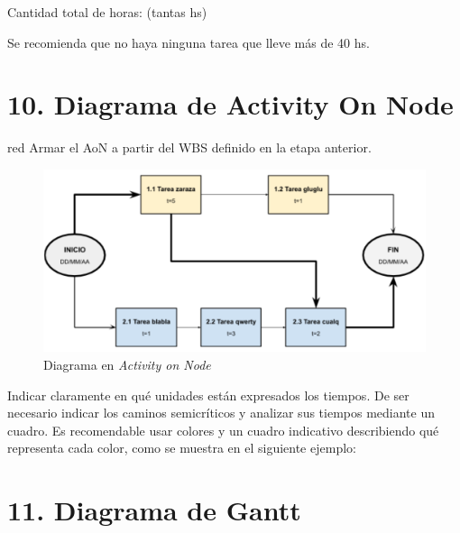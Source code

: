 \documentclass[
11pt, %
]{charter}
\begin{document}
Cantidad total de horas: (tantas hs)

Se recomienda que no haya ninguna tarea que lleve más de 40 hs. 

\section{10. Diagrama de Activity On Node}
\label{sec:AoN}

\begin{consigna}{red}
Armar el AoN a partir del WBS definido en la etapa anterior. 



\end{consigna}

\begin{figure}[htpb]
\centering 
\includegraphics[width=.8\textwidth]{./Figuras/AoN.png}
\caption{Diagrama en \textit{Activity on Node}}
\label{fig:AoN}
\end{figure}

Indicar claramente en qué unidades están expresados los tiempos.
De ser necesario indicar los caminos semicríticos y analizar sus tiempos mediante un cuadro.
Es recomendable usar colores y un cuadro indicativo describiendo qué representa cada color, como se muestra en el siguiente ejemplo:



\section{11. Diagrama de Gantt}
\label{sec:gantt}
\end{document}
